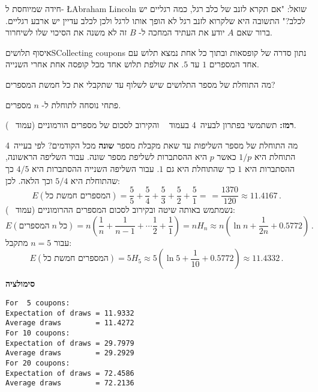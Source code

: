 
חידה שמיוחסת ל-%
\L{Abraham Lincoln}
שואל: "אם תקרא לזנב של כלב רגל, כמה רגליים יש לכלב?" התשובה היא שלקרוא לזנב רגל לא הופך אותו לרגל ולכן לכלב עדיין יש ארבע רגליים. ברור שאם
$A$
יודע את העתיד המחכה ל-%
$B$
זה לא משנה את הסיכוי שלו לשיחרור.


\begin{prob}{איסוף תלושים}{S}{Collecting coupons}
נתון סדרה של קופסאות ובתוך כל אחת נמצא תלוש עם אחד המספרים 
$1$
עד
$5$.
את שולפת תלוש אחד מכל קופסה אחת אחרי השנייה.

מה התוחלת של מספר התלושים שיש לשלוף עד שתקבלי את כל חמשת המספרים?

פתחי נוסחה לתוחלת ל-%
$n$
מספרים.

\textbf{רמז:}
תשתמשי בפתרון לבעיה~4 בעמוד%
~\pageref{p.four}
והקירוב לסכום של מספרים הורמוניים 
(עמוד%
~\pageref{p.harmonic}).
\end{prob}

\solution{}

מה התוחלת של מספר השליפות עד שאת מקבלת מספר
\textbf{שונה}
מכל הקודמים? לפי בעייה~4 התוחלת היא
$1/p$
כאשר 
$p$
היא ההסתברות לשליפת מספר שונה. עבור השליפה הראשונה, ההסתברות היא 
$1$
כך שהתוחלת היא גם
$1$.
עבור השליפה השנייה ההסתברות היא 
$4/5$
כך שהתוחלת היא 
$5/4$
וכך הלאה. לכן:
\[
E(\textrm{המספרים חמשת כל}) = \frac{5}{5}+\frac{5}{4} + \frac{5}{3} + \frac{5}{2} + \frac{5}{1} = \frac{}{} =\frac{1370}{120}\approx 11.4167\,.
\]
נשמתמש באותה שיטה ובקירוב לסכום המספרים ההרומוניים (עמוד%
~\pageref{p.harmonic}):
\[
E(\textrm{המספרים}\;n \;\textrm{כל}) = n\left(\frac{1}{n}+\frac{1}{n-1} + \cdots \frac{1}{2} + \frac{1}{1}\right) =nH_n\approx n\left(\ln n + \frac{1}{2n} + 0.5772\right)\,. 
\]
עבור
$n=5$
מתקבל:
\[
E(\textrm{המספרים חמשת כל}) =5H_5\approx 5(\ln 5 + \frac{1}{10} + 0.5772) \approx 11.4332\,.
\]

\textbf{סימולציה}
\begin{verbatim}
For  5 coupons:
Expectation of draws = 11.9332
Average draws        = 11.4272
For 10 coupons:
Expectation of draws = 29.7979
Average draws        = 29.2929
For 20 coupons:
Expectation of draws = 72.4586
Average draws        = 72.2136
\end{verbatim}



